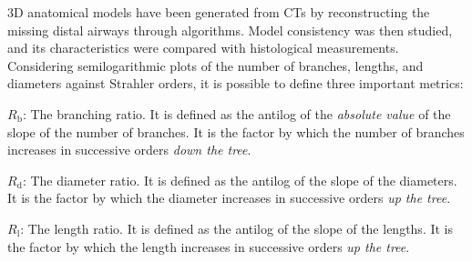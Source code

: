 3D anatomical models have been generated from CTs by reconstructing
the missing distal airways through
algorithms\cite{tgavalekos2003,tawhai2000}.  Model consistency was
then studied, and its characteristics were compared with histological
measurements\cite{horsfield1987}.  Considering semilogarithmic plots
of the number of branches, lengths, and diameters against Strahler orders,
it is possible to define three important metrics:

\begin{description}
\item $R_{\text{b}}$: The branching ratio. It is defined as the
  antilog of the \emph{absolute value} of the slope of the number of
  branches. It is the factor by which the number of branches increases
  in successive orders \emph{down the tree}.
\item $R_{\text{d}}$: The diameter ratio. It is defined as the antilog
  of the slope of the diameters. It is the factor by which the
  diameter increases in successive orders \emph{up the tree}.
\item $R_{\text{l}}$: The length ratio.  It is defined as the antilog
  of the slope of the lengths.  It is the factor by which the length
  increases in successive orders \emph{up the tree}.
\end{description}






